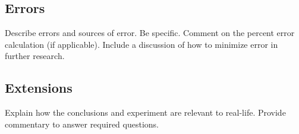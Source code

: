 \documentclass[stu,biblatex,floatsintext,draftall]{apa7}
\begin{document}
\subsection{Errors}
Describe errors and sources of error. Be specific. Comment on the percent error calculation (if applicable).  Include a discussion of how to minimize error in further research. 

\subsection{Extensions}
Explain how the conclusions and experiment are relevant to real-life.  Provide commentary to answer required questions.

\printbibliography
\end{document}
